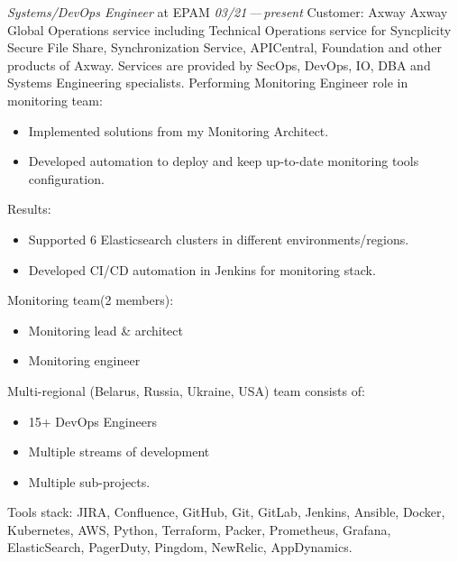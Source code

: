 \documentclass[11pt]{letter}
\newcommand{\forceindent}{\leavevmode{\parindent=1em\indent} %
}
\begin{document}
\begin{etaremune}[
  topsep=1ex,itemsep=1.5ex,partopsep=0ex,
  parsep=0ex,rightmargin=1em,leftmargin=2em
]
  \item
    \emph{Systems/DevOps Engineer}\hfill
    at EPAM\hspace{14em}
    \textit{03/21\,—\,present}\vspace{1em}\newline
    \forceindent Customer: Axway\vspace{0.5em}\newline
    \forceindent Axway Global Operations service including Technical Operations service for Syncplicity Secure File Share,  Synchronization Service,  APICentral, Foundation and other products of Axway. Services are provided by SecOps, DevOps, IO, DBA and Systems Engineering specialists.\vspace{0.5em}\newline
    \forceindent Performing Monitoring Engineer role in monitoring team: \begin{itemize}
        \item Implemented solutions from my Monitoring Architect. \\
        \item Developed automation to deploy and keep up-to-date monitoring tools configuration. \\
    \end{itemize}
    \forceindent Results: \begin{itemize}
        \item Supported 6 Elasticsearch clusters in different environments/regions.
        \item Developed CI/CD automation in Jenkins for monitoring stack.
    \end{itemize}
     \forceindent Monitoring team(2 members): \begin{itemize}
        \item Monitoring lead \& architect \\
        \item Monitoring engineer
    \end{itemize}

    \forceindent Multi-regional (Belarus, Russia, Ukraine, USA) team consists of: \begin{itemize}
        \item 15+ DevOps Engineers
        \item Multiple streams of development
        \item Multiple sub-projects.
    \end{itemize}
    \forceindent Tools stack: JIRA, Confluence, GitHub, Git, GitLab, Jenkins, Ansible, Docker, Kubernetes, AWS, Python, Terraform,  Packer,  Prometheus, Grafana, ElasticSearch, PagerDuty, Pingdom, NewRelic, AppDynamics.
  

\end{etaremune}
\end{document}
